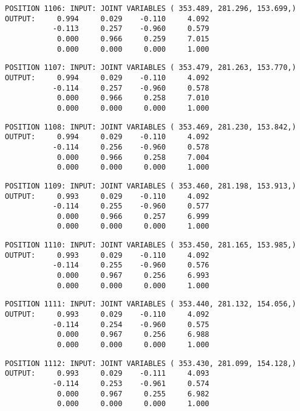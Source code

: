 \begin{verbatim}
POSITION 1106: INPUT: JOINT VARIABLES ( 353.489, 281.296, 153.699,)
OUTPUT:     0.994     0.029    -0.110     4.092
           -0.113     0.257    -0.960     0.579
            0.000     0.966     0.259     7.015
            0.000     0.000     0.000     1.000
\end{verbatim} \pagebreak[1]\begin{verbatim}
POSITION 1107: INPUT: JOINT VARIABLES ( 353.479, 281.263, 153.770,)
OUTPUT:     0.994     0.029    -0.110     4.092
           -0.114     0.257    -0.960     0.578
            0.000     0.966     0.258     7.010
            0.000     0.000     0.000     1.000
\end{verbatim} \pagebreak[1]\begin{verbatim}
POSITION 1108: INPUT: JOINT VARIABLES ( 353.469, 281.230, 153.842,)
OUTPUT:     0.994     0.029    -0.110     4.092
           -0.114     0.256    -0.960     0.578
            0.000     0.966     0.258     7.004
            0.000     0.000     0.000     1.000
\end{verbatim} \pagebreak[1]\begin{verbatim}
POSITION 1109: INPUT: JOINT VARIABLES ( 353.460, 281.198, 153.913,)
OUTPUT:     0.993     0.029    -0.110     4.092
           -0.114     0.255    -0.960     0.577
            0.000     0.966     0.257     6.999
            0.000     0.000     0.000     1.000
\end{verbatim} \pagebreak[1]\begin{verbatim}
POSITION 1110: INPUT: JOINT VARIABLES ( 353.450, 281.165, 153.985,)
OUTPUT:     0.993     0.029    -0.110     4.092
           -0.114     0.255    -0.960     0.576
            0.000     0.967     0.256     6.993
            0.000     0.000     0.000     1.000
\end{verbatim} \pagebreak[1]\begin{verbatim}
POSITION 1111: INPUT: JOINT VARIABLES ( 353.440, 281.132, 154.056,)
OUTPUT:     0.993     0.029    -0.110     4.092
           -0.114     0.254    -0.960     0.575
            0.000     0.967     0.256     6.988
            0.000     0.000     0.000     1.000
\end{verbatim} \pagebreak[1]\begin{verbatim}
POSITION 1112: INPUT: JOINT VARIABLES ( 353.430, 281.099, 154.128,)
OUTPUT:     0.993     0.029    -0.111     4.093
           -0.114     0.253    -0.961     0.574
            0.000     0.967     0.255     6.982
            0.000     0.000     0.000     1.000
\end{verbatim} \pagebreak[1]\begin{verbatim}

\end{verbatim}
